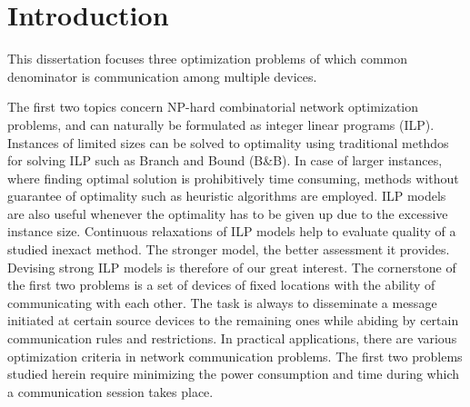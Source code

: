 
%
%
\newtheorem{theorem}{\textbf{Theorem}}
\newtheorem{remark}[theorem]{\textbf{Remark}}

\chapter{Introduction}
%
This dissertation focuses three optimization problems of which common denominator is communication among multiple devices.

The first two topics concern NP-hard combinatorial network optimization problems, and can naturally be formulated as integer linear programs (ILP).
Instances of limited sizes can be solved to optimality using traditional methdos for solving ILP such as Branch and Bound (B\&B).
In case of larger instances, where finding optimal solution is prohibitively time consuming, methods without guarantee of optimality such as heuristic algorithms are employed.
ILP models are also useful whenever the optimality has to be given up due to the excessive instance size.
Continuous relaxations of ILP models help to evaluate quality of a studied inexact method.
The stronger model, the better assessment it provides.
Devising strong ILP models is therefore of our great interest.
The cornerstone of the first two problems is a set of devices of fixed locations with the ability of communicating with each other.
The task is always to disseminate a message initiated at certain source devices to the remaining ones while abiding by certain communication rules and restrictions.
In practical applications, there are various optimization criteria in network communication problems.
The first two problems studied herein require minimizing the power consumption and time during which a communication session takes place.

